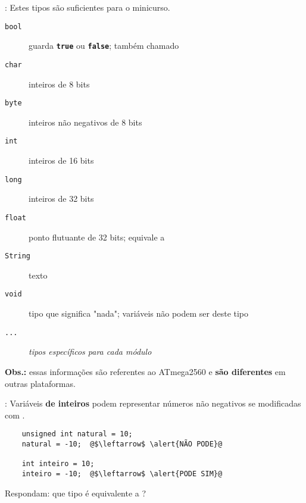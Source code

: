 \begin{frame}{\insertsection: \insertsubsection}
  Estes tipos são suficientes para o minicurso.

  \begin{description}
    \item[\texttt{bool}] guarda \textbf{\texttt{true}} ou \textbf{\texttt{false}}; também chamado \texttt{}
    \item[\texttt{char}] inteiros de 8 bits
    \item[\texttt{byte}] inteiros não negativos de 8 bits
    \item[\texttt{int}] inteiros de 16 bits
    \item[\texttt{long}] inteiros de 32 bits
    \item[\texttt{float}] ponto flutuante de 32 bits; equivale a \texttt{}
    \item[\texttt{String}] texto
    \item[\texttt{void}] tipo que significa "nada"; variáveis não podem ser deste tipo
    \item[\texttt{...}] \textit{tipos específicos para cada módulo}
  \end{description}

  \vfill
  \textbf{Obs.:} essas informações são referentes ao ATmega2560 e \textbf{são diferentes} em outras plataformas.
\end{frame}


\begin{frame}[fragile]{\insertsection: \insertsubsection}
  Variáveis \textbf{de inteiros} podem representar números não negativos se modificadas com \texttt{}.
  \begin{verbatim}
    unsigned int natural = 10;
    natural = -10;  @$\leftarrow$ \alert{NÃO PODE}@

    int inteiro = 10;
    inteiro = -10;  @$\leftarrow$ \alert{PODE SIM}@
  \end{verbatim}

  \pause
  \bigskip
  Respondam: que tipo é equivalente a \texttt{}?\\
\end{frame}


